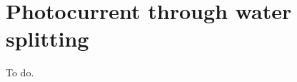 

\section{Photocurrent through water splitting}
\label{sec:photocurrent}
To do.































